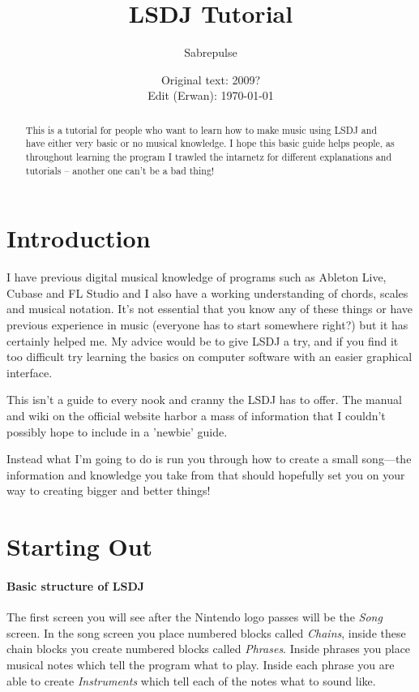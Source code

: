 \documentclass[]{article}
\title{LSDJ Tutorial}
\author{Sabrepulse}
\date{Original text: 2009? \\ Edit (Erwan): \today}
\begin{document}
\maketitle

\begin{abstract}
This is a tutorial for people who want to learn how to make music using LSDJ and have either very basic or no musical knowledge. I hope this basic guide helps people, as throughout learning the program I trawled the intarnetz for different explanations and tutorials – another one can’t be a bad thing!
\end{abstract}


\tableofcontents

\section{Introduction}



I have previous digital musical knowledge of programs such as Ableton Live, Cubase and FL Studio and I also have a working understanding of chords, scales and musical notation. It's not essential that you know any of these things or have previous experience in music (everyone has to start somewhere right?) but it has certainly helped me. My advice would be to give LSDJ a try, and if you find it too difficult try learning the basics on computer software with an easier graphical interface.

This isn't a guide to every nook and cranny the LSDJ has to offer. The manual and wiki on the official website harbor a mass of information that I couldn't possibly hope to include in a 'newbie' guide.

Instead what I'm going to do is run you through how to create a small song---the information and knowledge you take from that should hopefully set you on your way to creating bigger and better things!

\section{Starting Out}



\paragraph{Basic structure of LSDJ}

The first screen you will see after the Nintendo logo passes will be the \textit{Song} screen.
%
In the song screen you place numbered blocks called \textit{Chains}, inside these chain blocks you create numbered blocks called \textit{Phrases}. Inside phrases you place musical notes which tell the program what to play. Inside each phrase you are able to create \textit{Instruments} which tell each of the notes what to sound like.
\end{document}
